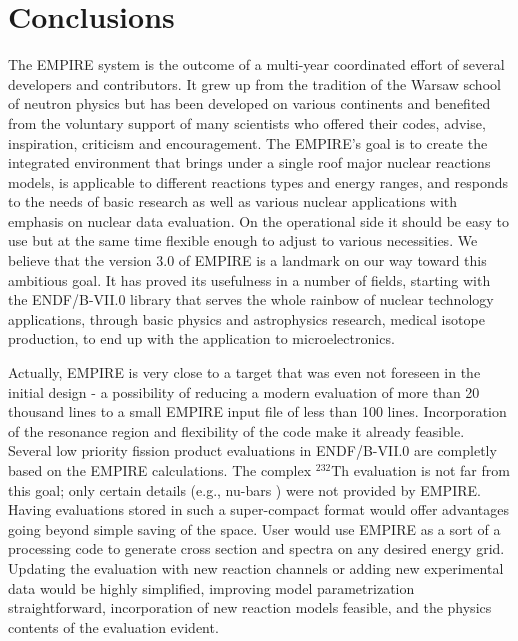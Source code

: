 \section{Conclusions}

The EMPIRE system is the outcome of a multi-year coordinated effort of
several developers and contributors. It grew up from the tradition of the
Warsaw school of neutron physics but has been developed on various
continents and benefited from the voluntary support of many scientists who
offered their codes, advise, inspiration, criticism and encouragement. The
EMPIRE's goal is to create the integrated environment that brings under a
single roof major nuclear reactions models, is applicable to different
reactions types and energy ranges, and responds to the needs of basic
research as well as various nuclear applications with emphasis on nuclear
data evaluation. On the operational side it should be easy to use but at the
same time flexible enough to adjust to various necessities. We believe that
the version 3.0 of EMPIRE is a landmark on our way toward this ambitious
goal. It has proved its usefulness in a number of fields, starting with the
ENDF/B-VII.0 library that serves the whole rainbow of nuclear technology
applications, through basic physics and astrophysics research, medical
isotope production, to end up with the application to microelectronics.

Actually, EMPIRE is very close to a target that was even not foreseen in the
initial design - a possibility of reducing a modern evaluation of more than
20 thousand lines to a small EMPIRE input file of less than 100 lines.
Incorporation of the resonance region and flexibility of the code make it
already feasible. Several low priority fission product evaluations in
ENDF/B-VII.0 are completly based on the EMPIRE calculations. The complex $%
^{232}$Th evaluation is not far from this goal; only certain details (e.g.,
nu-bars ) were not provided by EMPIRE. Having evaluations stored in such a
super-compact format would offer advantages going beyond simple saving of
the space. User would use EMPIRE as a sort of a processing code to generate
cross section and spectra on any desired energy grid. Updating the
evaluation with new reaction channels or adding new experimental data would
be highly simplified, improving model parametrization straightforward,
incorporation of new reaction models feasible, and the physics contents of
the evaluation evident.

